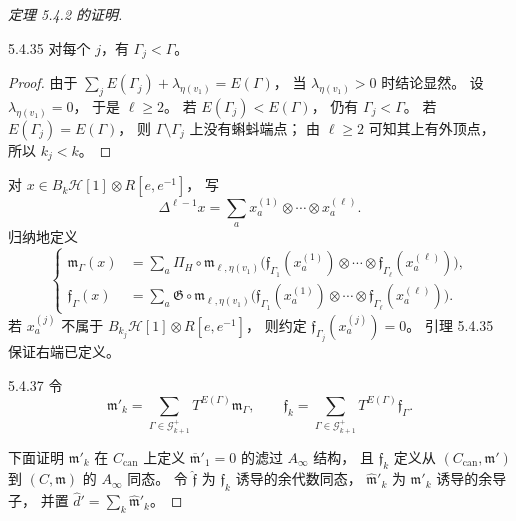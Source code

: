 \begin{proof}[定理 5.4.2 的证明]
\begin{lemma}{5.4.35}\label{lem:5-4-35}
对每个 $j$，有 $\Gamma_j<\Gamma$。
\end{lemma}
\begin{proof}
由于
$\sum_jE(\Gamma_j)+\lambda_{\eta(v_1)}
=E(\Gamma)$，
当 $\lambda_{\eta(v_1)}>0$ 时结论显然。
设 $\lambda_{\eta(v_1)}=0$，
于是 $\ell\geq2$。
若 $E(\Gamma_j)<E(\Gamma)$，
仍有 $\Gamma_j<\Gamma$。
若 $E(\Gamma_j)=E(\Gamma)$，
则 $\Gamma\setminus\Gamma_j$
上没有蝌蚪端点；
由 $\ell\geq2$ 可知其上有外顶点，
所以 $k_j<k$。
\end{proof}

对 $x\in B_k\mathcal H[1]\otimes R[e,e^{-1}]$，
写
\[
\Delta^{\ell-1}x
=\sum_a x_a^{(1)}\otimes\cdots\otimes x_a^{(\ell)}.
\]
归纳地定义
\begin{equation}
\left\{\begin{aligned}
\mathfrak m_\Gamma(x)
&=\sum_a\Pi_H\circ
\mathfrak m_{\ell,\eta(v_1)}
\bigl(\mathfrak f_{\Gamma_1}(x_a^{(1)})
\otimes\cdots\otimes
\mathfrak f_{\Gamma_\ell}(x_a^{(\ell)})\bigr),\\
\mathfrak f_\Gamma(x)
&=\sum_a\mathfrak G\circ
\mathfrak m_{\ell,\eta(v_1)}
\bigl(\mathfrak f_{\Gamma_1}(x_a^{(1)})
\otimes\cdots\otimes
\mathfrak f_{\Gamma_\ell}(x_a^{(\ell)})\bigr).
\end{aligned}\right.
\tag{5.4.36}\label{eq:5-4-36}
\end{equation}
若 $x_a^{(j)}$ 不属于
$B_{k_j}\mathcal H[1]\otimes R[e,e^{-1}]$，
则约定 $\mathfrak f_{\Gamma_j}(x_a^{(j)})=0$。
引理 5.4.35 保证右端已定义。

\begin{definition}{5.4.37}\label{def:5-4-37}
令
\[
\mathfrak m'_k
=\sum_{\Gamma\in\mathcal G^+_{k+1}}
T^{E(\Gamma)}\mathfrak m_\Gamma,
\qquad
\mathfrak f_k
=\sum_{\Gamma\in\mathcal G^+_{k+1}}
T^{E(\Gamma)}\mathfrak f_\Gamma.
\]
\end{definition}

下面证明 $\mathfrak m'_k$ 在
$C_{\mathrm{can}}$ 上定义
$\overline{\mathfrak m}'_1=0$
的滤过 $A_\infty$ 结构，
且 $\mathfrak f_k$ 定义从
$(C_{\mathrm{can}},\mathfrak m')$
到 $(C,\mathfrak m)$ 的
$A_\infty$ 同态。
令 $\widehat{\mathfrak f}$
为 $\mathfrak f_k$ 诱导的余代数同态，
$\widehat{\mathfrak m}'_k$
为 $\mathfrak m'_k$ 诱导的余导子，
并置
$\widehat d'=\sum_k\widehat{\mathfrak m}'_k$。


\end{proof}
